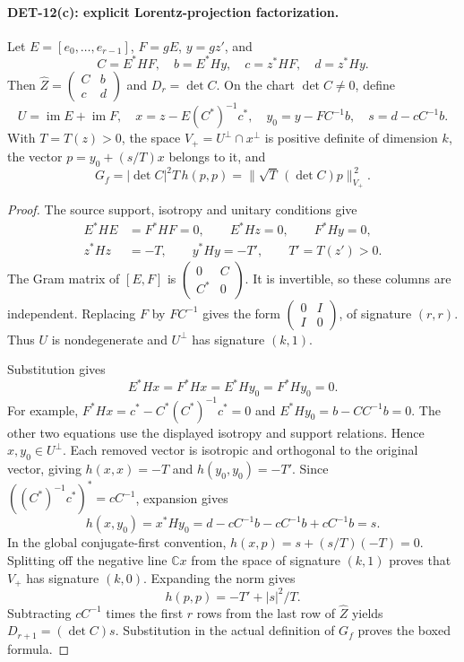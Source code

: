 \paragraph{DET-12(c): explicit Lorentz-projection factorization.}
Let \(E=[e_0,\ldots,e_{r-1}]\), \(F=gE\), \(y=gz'\), and
\[
 C=E^*HF,\quad b=E^*Hy,\quad c=z^*HF,\quad d=z^*Hy.
\]
Then \(\widehat Z=\left(\begin{smallmatrix}C&b\\c&d\end{smallmatrix}\right)\)
and \(D_r=\det C\). On the chart \(\det C\ne0\), define
\[
 U=\operatorname{im}E+\operatorname{im}F,\quad
 x=z-E(C^*)^{-1}c^*,\quad y_0=y-FC^{-1}b,\quad
 s=d-cC^{-1}b.
\]
With \(T=T(z)>0\), the space
\(V_+=U^\perp\cap x^\perp\) is positive definite of dimension \(k\),
the vector \(p=y_0+(s/T)x\) belongs to it, and
\[
 \boxed{\quad G_f=|\det C|^2T\,h(p,p)
 =\bigl\|\sqrt T\,(\det C)p\bigr\|_{V_+}^{\,2}.\quad}
\]
\begin{proof}
The source support, isotropy and unitary conditions give
\begin{align*}
 E^*HE&=F^*HF=0,\qquad E^*Hz=0,\qquad F^*Hy=0,\\
 z^*Hz&=-T,\qquad y^*Hy=-T',\qquad T'=T(z')>0.
\end{align*}
The Gram matrix of \([E,F]\) is
\(\left(\begin{smallmatrix}0&C\\C^*&0\end{smallmatrix}\right)\).
It is invertible, so these columns are independent.
Replacing \(F\) by \(FC^{-1}\) gives the form
\(\left(\begin{smallmatrix}0&I\\I&0\end{smallmatrix}\right)\),
of signature \((r,r)\). Thus \(U\) is nondegenerate and \(U^\perp\)
has signature \((k,1)\).

Substitution gives
\[
 E^*Hx=F^*Hx=E^*Hy_0=F^*Hy_0=0.
\]
For example,
\(F^*Hx=c^*-C^*(C^*)^{-1}c^*=0\) and
\(E^*Hy_0=b-CC^{-1}b=0\).
The other two equations use the displayed isotropy and support
relations. Hence \(x,y_0\in U^\perp\).
Each removed vector is isotropic and orthogonal to the original
vector, giving \(h(x,x)=-T\) and \(h(y_0,y_0)=-T'\).
Since \(((C^*)^{-1}c^*)^*=cC^{-1}\), expansion gives
\[
 h(x,y_0)=x^*Hy_0
 =d-cC^{-1}b-cC^{-1}b+cC^{-1}b=s.
\]
In the global conjugate-first convention,
\(h(x,p)=s+(s/T)(-T)=0\). Splitting off the negative line
\(\mathbb Cx\) from the space of signature \((k,1)\) proves that
\(V_+\) has signature \((k,0)\). Expanding the norm gives
\[
 h(p,p)=-T'+|s|^2/T.
\]
Subtracting \(cC^{-1}\) times the first \(r\) rows from the last
row of \(\widehat Z\) yields
\(D_{r+1}=(\det C)s\). Substitution in the actual definition of
\(G_f\) proves the boxed formula.
\end{proof}

